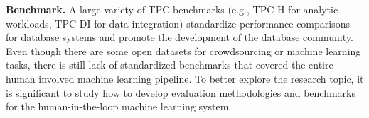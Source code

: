 

\textbf{Benchmark.} A large variety of TPC benchmarks (e.g., TPC-H for analytic workloads, TPC-DI for data integration) standardize performance comparisons for database systems and promote the development of the database community. Even though there are some open datasets for crowdsourcing  or machine learning tasks, there is still lack of standardized benchmarks that covered the entire human involved machine learning pipeline. To better explore the research topic, it is significant to study how to develop evaluation methodologies and benchmarks for the human-in-the-loop machine learning system.









